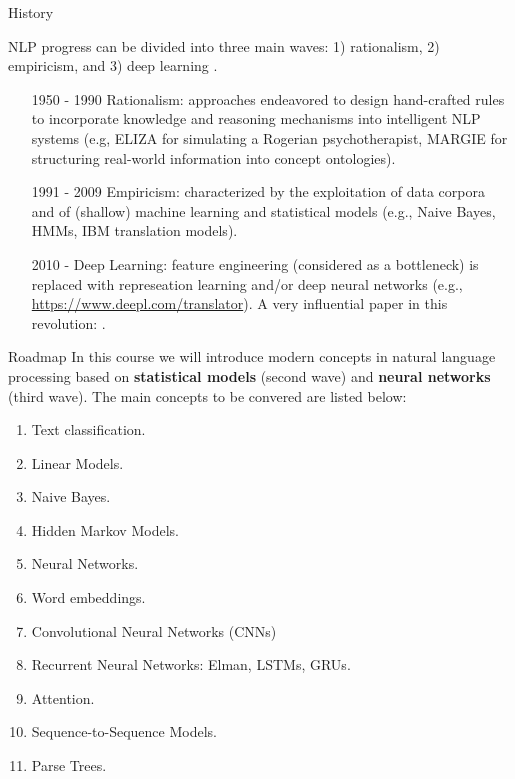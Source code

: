 \documentclass[handout]{beamer}
\begin{document}
\begin{frame}{History}
\begin{scriptsize}
NLP progress can be divided into three main waves: 1) rationalism, 2) empiricism, and 3) deep learning \cite{deng2018deep}.
\begin{itemize}
\item [1950 - 1990] Rationalism: approaches endeavored to design hand-crafted rules to incorporate knowledge and reasoning mechanisms into intelligent NLP systems (e.g,  ELIZA for simulating a Rogerian psychotherapist, MARGIE for structuring real-world information into concept ontologies).
\item [1991 - 2009] Empiricism: characterized by the exploitation of data corpora and
of (shallow) machine learning and statistical models (e.g., Naive Bayes, HMMs, IBM translation models).
\item [2010 - ] Deep Learning: feature engineering (considered as a bottleneck) is replaced with represeation learning and/or deep neural networks (e.g., \url{https://www.deepl.com/translator}). A very influential paper in this revolution: \cite{collobert2011natural}.
\end{itemize}

\end{scriptsize}
\end{frame}



\begin{frame}{Roadmap}
In this course we will introduce modern concepts in natural language processing based on \textbf{statistical models} (second wave) and \textbf{neural networks} (third wave). The main concepts to be convered are listed below:
\begin{scriptsize}
\begin{enumerate}
\item Text classification.
\item Linear Models.
\item Naive Bayes.
\item Hidden Markov Models.
\item Neural Networks.
\item Word embeddings.
\item Convolutional Neural Networks (CNNs) 
\item Recurrent Neural Networks: Elman, LSTMs, GRUs. 
\item Attention.
\item Sequence-to-Sequence Models.
\item Parse Trees.
\end{enumerate} 
\end{scriptsize}
\end{frame}
\end{document}
